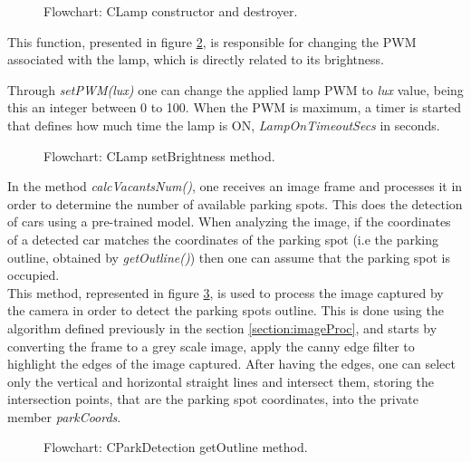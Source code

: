 \begin{figure}[H]
	\centering	
	\caption{Flowchart: CLamp constructor and destroyer.}
	\label{fig:CLampconstructor}
\end{figure}

This function, presented in figure \ref{fig:CLampsetBrightness}, is responsible for changing the PWM associated with the lamp, which is directly related to its brightness.

Through \textit{setPWM(lux)} one can change the applied lamp PWM to \textit{lux} value, being this an integer between 0 to 100. When the PWM is maximum, a timer is started that defines how much time the lamp is ON, \textit{LampOnTimeoutSecs} in seconds.

\begin{figure}[H]
	\centering	
	\caption{Flowchart: CLamp setBrightness method.}
	\label{fig:CLampsetBrightness}
\end{figure}

\clearpage
{}

In the method \textit{calcVacantsNum()}, one receives an image frame and processes it in order to determine the number of available parking spots. This does the detection of cars using a pre-trained model. When analyzing the image, if the coordinates of a detected car matches the coordinates of the parking spot (i.e the parking outline, obtained by \textit{getOutline()}) then one can assume that the parking spot is occupied. \\

This method, represented in figure \ref{fig:CParkDetectiongetoutline}, is used to process the image captured by the camera in order to detect the parking spots outline. This is done using the algorithm defined previously in the section \ref{section:imageProc}, and starts by converting the frame to a grey scale image, apply the canny edge filter to highlight the edges of the image captured. After having the edges, one can select only the vertical and horizontal straight lines and intersect them, storing the intersection points, that are the parking spot coordinates, into the private member \textit{parkCoords}.

\begin{figure}[H]
	\centering			
	\caption{Flowchart: CParkDetection getOutline method.}
	\label{fig:CParkDetectiongetoutline}
\end{figure}

